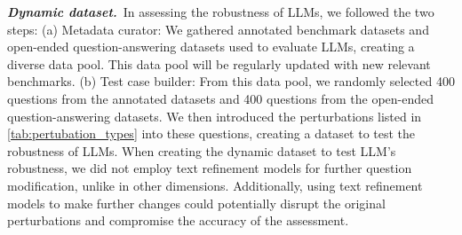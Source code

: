 \textbf{\textit{Dynamic dataset.}}~In assessing the robustness of LLMs, we followed the two steps:
(a) Metadata curator: We gathered annotated benchmark datasets and open-ended question-answering datasets used to evaluate LLMs, creating a diverse data pool. This data pool will be regularly updated with new relevant benchmarks.
(b) Test case builder: From this data pool, we randomly selected 400 questions from the annotated datasets and 400 questions from the open-ended question-answering datasets. We then introduced the perturbations listed in \autoref{tab:pertubation_types} into these questions, creating a dataset to test the robustness of LLMs.
When creating the dynamic dataset to test LLM's robustness, we did not employ text refinement models for further question modification, unlike in other dimensions. Additionally, using text refinement models to make further changes could potentially disrupt the original perturbations and compromise the accuracy of the assessment.



